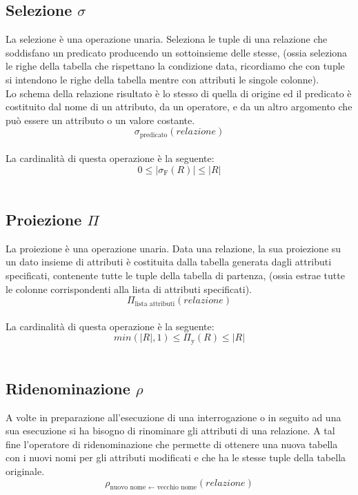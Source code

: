 \documentclass{report}
\begin{document}
\subsection{Selezione $\sigma$}
La selezione è una operazione unaria. Seleziona le tuple di una relazione che soddisfano un predicato
producendo un sottoinsieme delle stesse, (ossia seleziona le righe della tabella che rispettano la condizione data, ricordiamo che con tuple si intendono le righe della tabella mentre con attributi le singole colonne).\\
Lo schema della relazione risultato è lo stesso di quella di origine ed il predicato è costituito dal nome di un attributo, da un operatore, e da un altro argomento che può essere un attributo o un valore
costante.\\
$$\sigma_{\text{predicato}}(relazione)$$\\
La cardinalità di questa operazione è la seguente:\\
$$ 0 \leq |\sigma_{\text{F}}(R)| \leq |R|$$\\

\subsection{Proiezione $\Pi$}
La proiezione è una operazione unaria. Data una relazione, la sua proiezione su un dato insieme di attributi è costituita dalla tabella generata dagli attributi specificati, contenente tutte le tuple della tabella di partenza, (ossia estrae tutte le colonne corrispondenti alla lista di attributi specificati).\\
$$\Pi_{\text{lista attributi}}(relazione)$$\\
La cardinalità di questa operazione è la seguente:\\
$$min(|R|, 1) \leq \Pi_{\text{y}}(R) \leq |R|$$\\

\subsection{Ridenominazione $\rho$}
A volte in preparazione all’esecuzione di una interrogazione o in seguito ad una sua esecuzione si ha bisogno di rinominare gli attributi di una relazione. A tal fine l’operatore di ridenominazione che permette di ottenere una nuova tabella con i nuovi nomi per gli attributi modificati e che ha le stesse tuple della tabella originale.\\
$$\rho_{\text{nuovo nome $\leftarrow$ vecchio nome}}(relazione)$$\\
\end{document}
